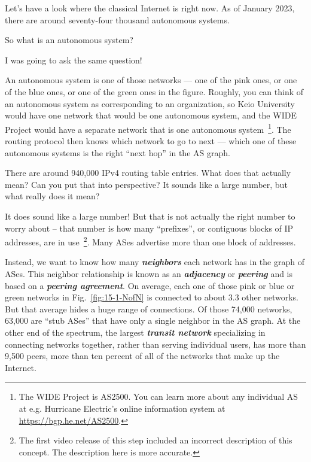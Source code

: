\mmm Let's have a look where the classical Internet is right now. As of January 2023, there are around seventy-four thousand autonomous systems.

\rrr So what is an autonomous system?

\mmm I was going to ask the same question!

\rrr An autonomous system is one of those networks --- one of the pink ones, or one of the blue ones, or one of the green ones in the figure. Roughly, you can think of an autonomous system as corresponding to an organization, so Keio University would have one network that would be one autonomous system, and the WIDE Project would have a separate network that is one autonomous system~\footnote{The WIDE Project is AS2500. You can learn more about any individual AS at e.g. Hurricane Electric's online information system at \url{https://bgp.he.net/AS2500}.}. The routing protocol then knows which network to go to next --- which one of these autonomous systems is the right ``next hop'' in the AS graph.

\mmm There are around 940,000 IPv4 routing table entries. What does that actually mean? Can you put that into perspective? It sounds like a large number, but what really does it mean?

\rrr It does sound like a large number! But that is not actually the right number to worry about -- that number is how many ``prefixes'', or contiguous blocks of IP addresses, are in use~\footnote{The first video release of this step included an incorrect description of this concept. The description here is more accurate.}.  Many ASes advertise more than one block of addresses.

Instead, we want to know how many \textbf{\emph{neighbors}} each network has in the graph of ASes.  This neighbor relationship is known as an \textbf{\emph{adjacency}} or \textbf{\emph{peering}} and is based on a \textbf{\emph{peering agreement}}.
On average, each one of those pink or blue or green networks in Fig.~\ref{fig:15-1-NofN} is connected to about 3.3 other networks. But that average hides a huge range of connections. Of those 74,000 networks, 63,000 are ``stub ASes'' that have only a single neighbor in the AS graph. At the other end of the spectrum, the largest \textbf{\emph{transit network}} specializing in connecting networks together, rather than serving individual users, has more than 9,500 peers, more than ten percent of all of the networks that make up the Internet.


